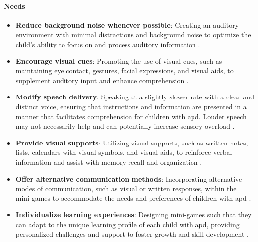 \paragraph{Needs}
\begin{itemize}
    \item \textbf{Reduce background noise whenever possible}: Creating an auditory environment with minimal distractions and background noise to optimize the child's ability to focus on and process auditory information \cite{Nationwide}.
    \item \textbf{Encourage visual cues}: Promoting the use of visual cues, such as maintaining eye contact, gestures, facial expressions, and visual aids, to supplement auditory input and enhance comprehension \cite{Nationwide}.
    \item \textbf{Modify speech delivery}: Speaking at a slightly slower rate with a clear and distinct voice, ensuring that instructions and information are presented in a manner that facilitates comprehension for children with \gls{apd}. Louder speech may not necessarily help and can potentially increase sensory overload \cite{KidsHealth}.
    \item \textbf{Provide visual supports}: Utilizing visual supports, such as written notes, lists, calendars with visual symbols, and visual aids, to reinforce verbal information and assist with memory recall and organization \cite{KidsHealth}.
    \item \textbf{Offer alternative communication methods}: Incorporating alternative modes of communication, such as visual or written responses, within the mini-games to accommodate the needs and preferences of children with \gls{apd} \cite{KidsHealth}.
    \item \textbf{Individualize learning experiences}: Designing mini-games such that they can adapt to the unique learning profile of each child with \gls{apd}, providing personalized challenges and support to foster growth and skill development \cite{KidsHealth}.
\end{itemize}


